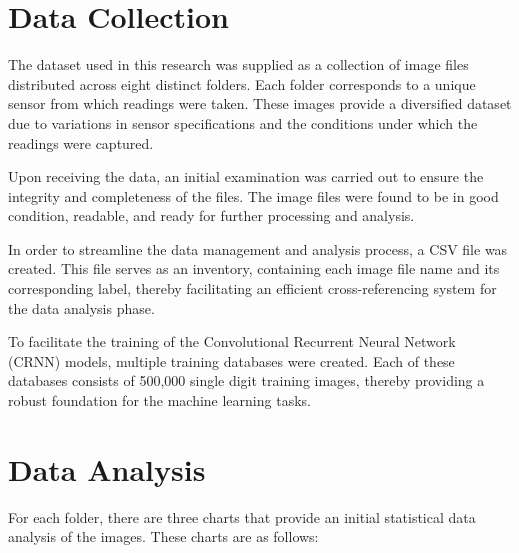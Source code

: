 \section{Data Collection}

The dataset used in this research was supplied as a collection of image files distributed across eight distinct folders. Each folder corresponds to a unique sensor from which readings were taken. These images provide a diversified dataset due to variations in sensor specifications and the conditions under which the readings were captured.

Upon receiving the data, an initial examination was carried out to ensure the integrity and completeness of the files. The image files were found to be in good condition, readable, and ready for further processing and analysis.

In order to streamline the data management and analysis process, a CSV file was created. This file serves as an inventory, containing each image file name and its corresponding label, thereby facilitating an efficient cross-referencing system for the data analysis phase.

To facilitate the training of the Convolutional Recurrent Neural Network (CRNN) models, multiple training databases were created. Each of these databases consists of 500,000 single digit training images, thereby providing a robust foundation for the machine learning tasks.

\newpage
\section{Data Analysis}

For each folder, there are three charts that provide an initial statistical data analysis of the images. These charts are as follows:


